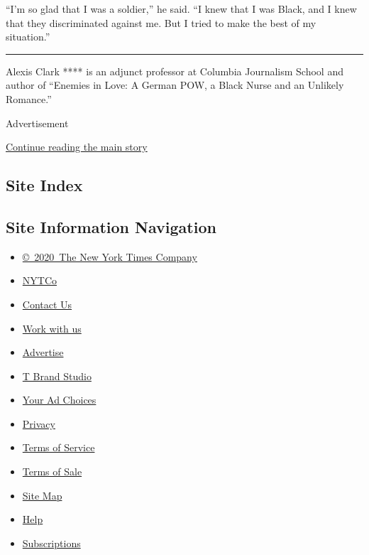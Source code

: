 ``I'm so glad that I was a soldier,'' he said. ``I knew that I was
Black, and I knew that they discriminated against me. But I tried to
make the best of my situation.''

\begin{center}\rule{0.5\linewidth}{\linethickness}\end{center}

Alexis Clark **** is an adjunct professor at Columbia Journalism School
and author of ``Enemies in Love: A German POW, a Black Nurse and an
Unlikely Romance.''

Advertisement

\protect\hyperlink{after-bottom}{Continue reading the main story}

\hypertarget{site-index}{%
\subsection{Site Index}\label{site-index}}

\hypertarget{site-information-navigation}{%
\subsection{Site Information
Navigation}\label{site-information-navigation}}

\begin{itemize}
\tightlist
\item
  \href{https://help.nytimes.com/hc/en-us/articles/115014792127-Copyright-notice}{©~2020~The
  New York Times Company}
\end{itemize}

\begin{itemize}
\tightlist
\item
  \href{https://www.nytco.com/}{NYTCo}
\item
  \href{https://help.nytimes.com/hc/en-us/articles/115015385887-Contact-Us}{Contact
  Us}
\item
  \href{https://www.nytco.com/careers/}{Work with us}
\item
  \href{https://nytmediakit.com/}{Advertise}
\item
  \href{http://www.tbrandstudio.com/}{T Brand Studio}
\item
  \href{https://www.nytimes.com/privacy/cookie-policy\#how-do-i-manage-trackers}{Your
  Ad Choices}
\item
  \href{https://www.nytimes.com/privacy}{Privacy}
\item
  \href{https://help.nytimes.com/hc/en-us/articles/115014893428-Terms-of-service}{Terms
  of Service}
\item
  \href{https://help.nytimes.com/hc/en-us/articles/115014893968-Terms-of-sale}{Terms
  of Sale}
\item
  \href{https://spiderbites.nytimes.com}{Site Map}
\item
  \href{https://help.nytimes.com/hc/en-us}{Help}
\item
  \href{https://www.nytimes.com/subscription?campaignId=37WXW}{Subscriptions}
\end{itemize}
